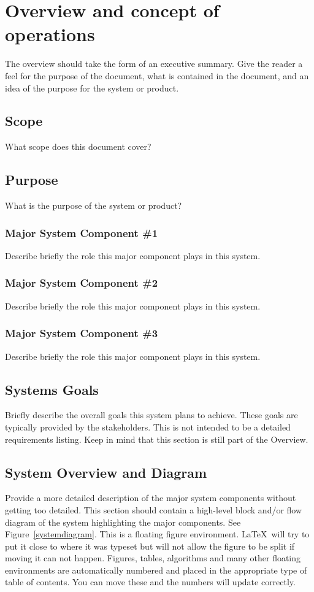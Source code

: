 
\chapter{Overview and concept of operations}

The overview should take the form of an executive summary.  Give the reader a feel 
for the purpose of the document, what is contained in the document, and an idea 
of the purpose for the system or product. 


\section{Scope}
What scope does this document cover? 


\section{Purpose}
What is the purpose of the system or product? 


\subsection{Major System Component \#1}
Describe briefly the role this major component plays in this system. 

\subsection{Major System Component \#2}
Describe briefly the role this major component plays in this system. 

\subsection{Major System Component \#3}
Describe briefly the role this major component plays in this system. 

\section{Systems Goals}
Briefly describe the overall goals this system plans to achieve.
These goals are typically provided by the stakeholders.  This is not
intended to be a detailed requirements listing.  Keep in mind that
this section is still part of the Overview.

\section{System Overview and Diagram}
Provide a more detailed description of the major system components
without getting too detailed.  This section should contain a
high-level block and/or flow diagram of the system highlighting the
major components.  See Figure~\ref{systemdiagram}.  This is a floating
figure environment.  \LaTeX\ will try to put it close to where it was
typeset but will not allow the figure to be split if moving it can not
happen.  Figures, tables, algorithms and many other floating
environments are automatically numbered and placed in the appropriate
type of table of contents.  You can move these and the numbers will
update correctly.

